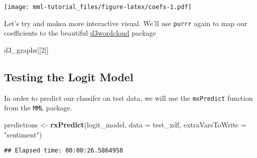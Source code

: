 \documentclass[]{book}
\newenvironment{Shaded}{\begin{snugshade}}{\end{snugshade}}
\newcommand{\KeywordTok}[1]{\textcolor[rgb]{0.13,0.29,0.53}{\textbf{#1}}}
\newcommand{\DataTypeTok}[1]{\textcolor[rgb]{0.13,0.29,0.53}{#1}}
\newcommand{\DecValTok}[1]{\textcolor[rgb]{0.00,0.00,0.81}{#1}}
\newcommand{\StringTok}[1]{\textcolor[rgb]{0.31,0.60,0.02}{#1}}
\newcommand{\OtherTok}[1]{\textcolor[rgb]{0.56,0.35,0.01}{#1}}
\newcommand{\OperatorTok}[1]{\textcolor[rgb]{0.81,0.36,0.00}{\textbf{#1}}}
\newcommand{\NormalTok}[1]{#1}
\theoremstyle{definition}
\theoremstyle{definition}
\theoremstyle{definition}
\theoremstyle{remark}
\begin{document}
\texttt{[image: mml-tutorial\_files/figure-latex/coefs-1.pdf]}

Let's try and makea more interactive visual. We'll use \texttt{purrr}
again to map our coefficients to the beautiful
\href{https://github.com/jbkunst/d3wordcloud}{d3wordcloud} package

\begin{Shaded}
\end{Shaded}

\hypertarget{htmlwidget-336dfbd44998e6742520}{}

\begin{Shaded}
\begin{Highlighting}[]
\NormalTok{d3_graphs[[}\DecValTok{2}\NormalTok{]]}
\end{Highlighting}
\end{Shaded}

\hypertarget{htmlwidget-06bc5f93d3d0df1cf391}{}

\subsection{Testing the Logit Model}\label{testing-the-logit-model}

In order to predict our classifer on test data, we will use the
\texttt{mxPredict} function from the \texttt{MML} package.

\begin{Shaded}
\begin{Highlighting}[]
\NormalTok{predictions <-}\StringTok{ }\KeywordTok{rxPredict}\NormalTok{(logit_model, }\DataTypeTok{data =}\NormalTok{ test_xdf, }\DataTypeTok{extraVarsToWrite =} \StringTok{"sentiment"}\NormalTok{)}
\end{Highlighting}
\end{Shaded}

\begin{verbatim}
## Elapsed time: 00:00:26.5864958
\end{verbatim}
\end{document}
